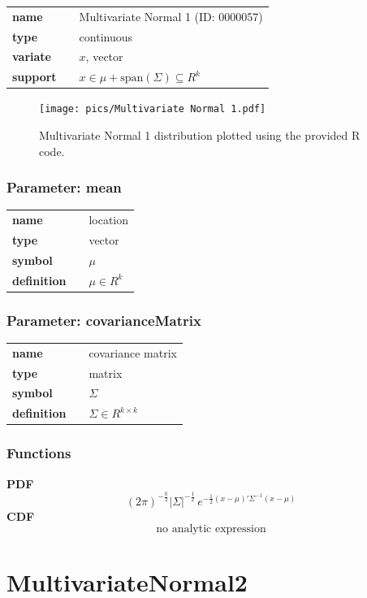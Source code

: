 \documentclass{article}
\begin{document}
  \bigskip 

\begin{tabular}{p{2cm}cl}
\textbf{name} & & Multivariate Normal 1 (ID: 0000057)\\ 
 
\textbf{type} & & continuous \\ 

\textbf{variate} & & $x$, vector \\ 

\textbf{support} & & $x \in \mu + \text{span}(\Sigma) \subseteq  R^k$
\end{tabular}

\begin{figure}[ht!]
\centering
  \texttt{[image: pics/Multivariate Normal 1.pdf]}
 \caption{Multivariate Normal 1 distribution plotted using the provided R code.}
 \label{fig:Multivariate Normal 1}
\end{figure}

\subsubsection*{Parameter: mean}

\noindent\begin{tabular}{p{2cm}cl}
\textbf{name} & & location \\
\textbf{type} & & vector \\
\textbf{symbol} & & $\mu$  \\
\textbf{definition} & & $\mu \in R^k$
\end{tabular}
\subsubsection*{Parameter: covarianceMatrix}

\noindent\begin{tabular}{p{2cm}cl}
\textbf{name} & & covariance matrix \\
\textbf{type} & & matrix \\
\textbf{symbol} & & $\Sigma$  \\
\textbf{definition} & & $\Sigma \in R^{k\times k}$
\end{tabular}
\subsubsection*{Functions}

\smallskip \noindent \hspace{.2cm} \textbf{PDF} 
\begin{equation*}(2\pi)^{-\frac{k}{2}}|\Sigma|^{-\frac{1}{2}}\, e^{ -\frac{1}{2}(x-\mu)'\Sigma^{-1}(x-\mu) }\end{equation*}
\smallskip \noindent \hspace{.2cm} \textbf{CDF} 
\begin{equation*}\text{no analytic expression}\end{equation*}
\smallskip\section*{MultivariateNormal2} 
\end{document}
